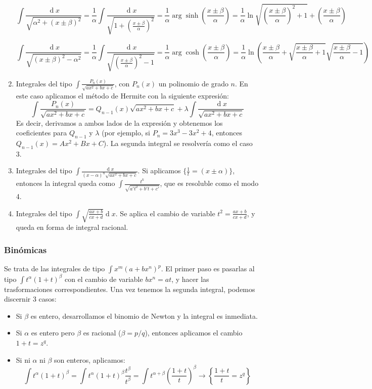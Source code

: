 \documentclass[a4paper]{article}
\renewcommand{\d}[1]{\ensuremath{\operatorname{d}\!{#1}}}
\begin{document}
\begin{enumerate}
	 \subitem $$\int \frac{\d{x}}{\sqrt{\alpha^2+(x\pm\beta)^2}} = 
	 \frac{1}{\alpha}\int \frac{\d{x}}{\sqrt{1+\left(\frac{x\pm\beta}{\alpha}\right)^2}} = \frac{1}{\alpha}\arg\sinh\left(\frac{x\pm\beta}{\alpha}\right) = \frac{1}{\alpha} \ln{\sqrt{\left(\frac{x\pm\beta}{\alpha}\right)^2+1}+\left(\frac{x\pm\beta}{\alpha}\right)} $$ 
	 
	 	 \subitem $$\int \frac{\d{x}}{\sqrt{(x\pm\beta)^2-\alpha^2}} = 
	 \frac{1}{\alpha}\int \frac{\d{x}}{\sqrt{\left(\frac{x\pm\beta}{\alpha}\right)^2-1}} = \frac{1}{\alpha}\arg\cosh\left(\frac{x\pm\beta}{\alpha}\right) = \frac{1}{\alpha} \ln{\left(\frac{x\pm\beta}{\alpha}+\sqrt{\frac{x\pm\beta}{\alpha}+1}\sqrt{\frac{x\pm\beta}{\alpha}-1}\right)} $$ 
	
	\item Integrales del tipo $\int \frac{P_n(x)}{\sqrt{ax^2+bx+c}}$, con $P_n(x)$ un polinomio de grado $n$. En este caso aplicamos el método de Hermite con la siguiente expresión:
	$$\int \frac{P_n(x)}{\sqrt{ax^2+bx+c}} = Q_{n-1}(x)\sqrt{ax^2+bx+c} + \lambda\int\frac{\d{x}}{\sqrt{ax^2+bx+c}}$$
	Es decir, derivamos a ambos lados de la expresión y obtenemos los coeficientes para $Q_{n-1}$ y $\lambda$ (por ejemplo, si $P_n = 3x^3-3x^2+4$, entonces $Q_{n-1}(x) = Ax^2+Bx+C$). La segunda integral se resolvería como el caso 3.
	
	\item Integrales del tipo $\int \frac{\d{x}}{(x-\alpha)^n\sqrt{ax^2+bx+c}}$. Si aplicamos $\{\frac{1}{t} = (x\pm\alpha)\}$, entonces la integral queda como  $\int \frac{t^k}{\sqrt{a't^2+b't+c'}}$, que es resoluble como el modo 4.

	\item Integrales del tipo $\int\sqrt{\frac{ax+b}{cx+d}}\d{x}$. Se aplica el cambio de variable $t^2 = \frac{ax+b}{cx+d}$, y queda en forma de integral racional.
\end{enumerate}

\subsubsection*{Binómicas}
Se trata de las integrales de tipo $\int x^m(a+bx^n)^p$. El primer paso es pasarlas al tipo $\int t^\alpha(1+t)^\beta$ con el cambio de variable $bx^n = at$, y hacer las trasformaciones correspondientes. Una vez tenemos la segunda integral, podemos discernir 3 casos:
\begin{itemize}
	\item Si $\beta$ es entero, desarrollamos el binomio de Newton y la integral es inmediata.
	\item Si $\alpha$ es entero pero $\beta$ es racional ($\beta = p/q$), entonces aplicamos el cambio $1+t = z^q$.
	\item Si ni $\alpha$ ni $\beta$ son enteros, aplicamos:
	$$\int t^\alpha(1+t)^\beta = \int t^\alpha(1+t)^\beta \frac{t^\beta}{t^\beta} = \int t^{\alpha+\beta}\left(\frac{1+t}{t}\right)^\beta \rightarrow \left\lbrace \frac{1+t}{t} = z^q \right\rbrace $$
\end{itemize}
\end{document}
